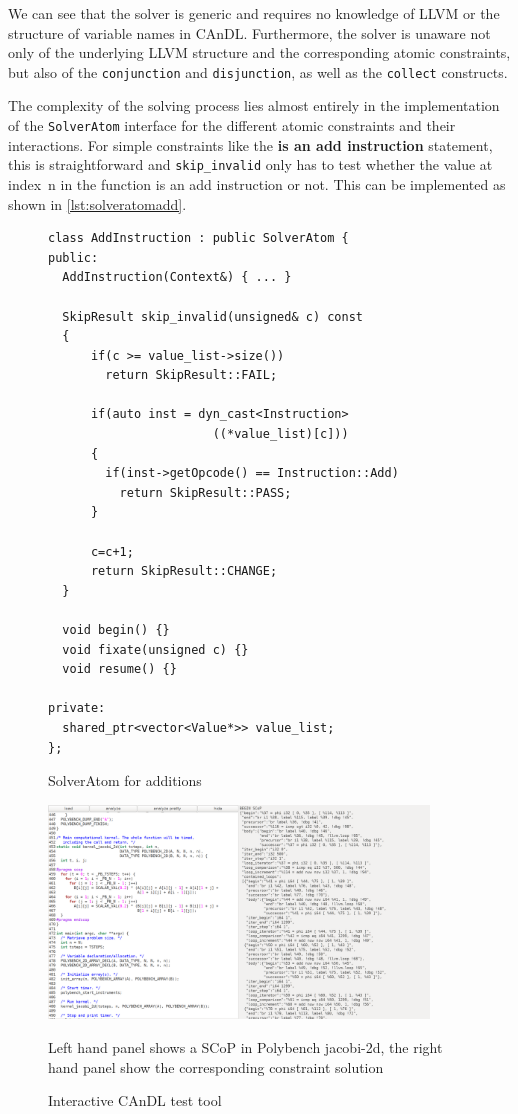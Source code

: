     We can see that the solver is generic and requires no knowledge of LLVM or
    the structure of variable names in CAnDL.
    Furthermore, the solver is unaware not only of the underlying LLVM structure
    and the corresponding atomic constraints, but also of the
    \texttt{conjunction} and \texttt{disjunction}, as well as the
    \texttt{collect} constructs.

    The complexity of the solving process lies almost entirely in the
    implementation of the \texttt{SolverAtom} interface for the different atomic
    constraints and their interactions.
    For simple constraints like the \textbf{is an add instruction} statement,
    this is straightforward and \texttt{skip\_invalid} only has to test whether
    the value at \mbox{index n} in the function is an add instruction or not.
    This can be implemented as shown in \autoref{lst:solveratomadd}.

\begin{figure}[ht]
\begin{lstlisting}
class AddInstruction : public SolverAtom {
public:
  AddInstruction(Context&) { ... }

  SkipResult skip_invalid(unsigned& c) const
  {
      if(c >= value_list->size())
        return SkipResult::FAIL;

      if(auto inst = dyn_cast<Instruction>
                       ((*value_list)[c]))
      {
        if(inst->getOpcode() == Instruction::Add)
          return SkipResult::PASS;
      }

      c=c+1;
      return SkipResult::CHANGE;
  }

  void begin() {}
  void fixate(unsigned c) {}
  void resume() {}

private:
  shared_ptr<vector<Value*>> value_list;
};
\end{lstlisting}
\vspace{-0.3cm}
\caption{SolverAtom for additions}
\label{lst:solveratomadd}
\end{figure}

\begin{figure}[ht]
\centering
\includegraphics[width=0.9\textwidth]{figures/visual_gui2.png}
\caption{Interactive CAnDL test tool}
\medskip
\small
Left hand panel shows a SCoP in Polybench jacobi-2d, the right hand panel show the corresponding constraint solution
\label{fig:gui}
\end{figure}

